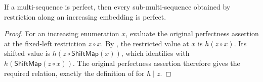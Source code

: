 \begin{lemma}
If a multi-sequence is perfect, then every sub-multi-sequence obtained by
restriction along an increasing embedding is perfect.
\end{lemma}
\begin{proof}
For an increasing enumeration $x$, evaluate the original perfectness
assertion at the fixed-left restriction $z\circ x$.  By
, the restricted value at $x$ is
$h(z\circ x)$.  Its shifted value is $h(z\circ\mathsf{ShiftMap}(x))$,
which  identifies with
$h(\mathsf{ShiftMap}(z\circ x))$.  The original perfectness assertion
therefore gives the required relation, exactly the definition of
 for $h\mathbin{|}z$.
\end{proof}
